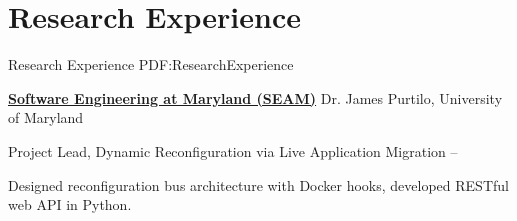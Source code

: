 
\section
{Research Experience}
{Research Experience}
{PDF:ResearchExperience}

\href{https://seam.cs.umd.edu/}
{\textbf{Software Engineering at Maryland (SEAM)}}
Dr. James Purtilo,
University of Maryland

\GapNoBreak
\hspace{1em} 
Project Lead, Dynamic Reconfiguration via Live Application Migration
\hfill
{} --
\begin{detail}
\SubBulletItem
Designed reconfiguration bus architecture with Docker hooks, developed RESTful web API in Python.
\end{detail}
